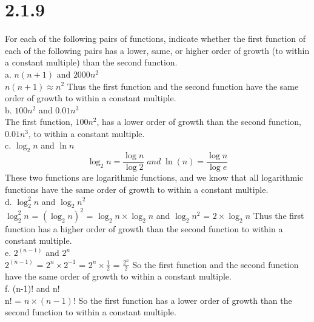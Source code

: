 \documentclass[8pt, letterpaper]{article}
\begin{document}
\section{2.1.9} 
For each of the following pairs of functions, indicate whether the first function of each of the following pairs has a lower, same, or higher order of growth (to within a constant multiple) than the second function. \\
a. $n(n + 1)$ and $2000n^2$ \\ 
    \indent $n(n + 1)\approx n^2$ Thus the first function and the second function have the same order of growth to within a constant multiple. \\
b. $100n^2$ and $0.01n^3$ \\
    \indent The first function, $100n^2$, has a lower order of growth than the second function, $0.01n^3$, to within a constant multiple. \\
c. $\log_2 n$ and $\ln n$ \\ 
    \indent $$\log_{2} n =  \frac{\log{n}}{\log{2}} \;and\; \ln(n) =  \frac{\log{n}}{\log{e}}$$ These two functions are logarithmic functions, and we know that all logarithmic functions have the same order of growth to within a constant multiple. \\
d. $\log_{2}^2 n$ and $\log_{2} n^2$ \\
    \indent $\log_{2}^{2} n$ = $(\log_2{n})^{2}$ = $\log_{2} n \times \log_{2} n$ and $\log_{2} n^2$ = $2 \times \log_{2} n$ Thus the first function has a higher order of growth than the second function to within a constant multiple. \\
e. $2^{(n-1)}$ and $2^{n}$ \\
    \indent $2^{(n-1)}$ = $2^n \times 2^{-1}$ = $2^n \times \frac{1}{2} $ = $\frac{2^n}{2}$ So the first function and the second function have the same order of growth to within a constant multiple. \\
f. (n-1)! and n! \\
    \indent n! = $n \times (n-1)!$ So the first function has a lower order of growth than the second function to within a constant multiple.
    
\end{document}
